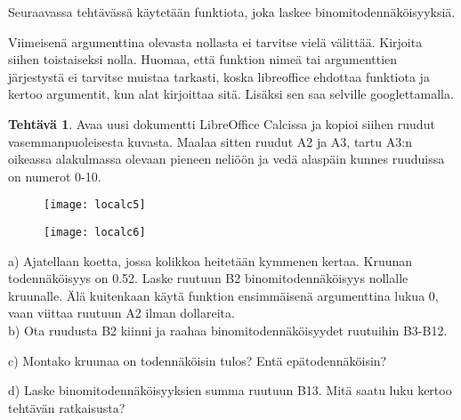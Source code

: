 \documentclass[12pt,leqno,a4paper,oneside]{amsart}
\theoremstyle{definition}
\newtheorem{exercise}{Tehtävä}
\theoremstyle{remark}
\numberwithin{equation}{section}
\begin{document}
Seuraavassa tehtävässä käytetään funktiota, joka laskee binomi\-toden\-näköisyyksiä.


Viimeisenä argumenttina olevasta nollasta ei tarvitse vielä välittää. Kirjoita siihen toistaiseksi nolla. Huomaa, että funktion nimeä
tai argumenttien järjestystä ei tarvitse muistaa tarkasti, koska libreoffice ehdottaa funktiota ja kertoo argumentit, kun alat kirjoittaa sitä.
Lisäksi sen saa selville googlettamalla.

\begin{exercise}
\label{lolaatikko}
 Avaa uusi dokumentti LibreOffice Calcissa ja kopioi sii\-hen ruudut vasemmanpuoleisesta kuvasta. Maalaa sitten ruudut A2 ja A3, tartu A3:n oikeassa alakulmassa
 olevaan pieneen neliöön ja vedä alaspäin kunnes ruuduissa on numerot 0-10.
 \begin{figure}[H]
 \begin{center} 
 \begin{minipage}{.45\textwidth}
 \texttt{[image: localc5]}
 \end{minipage}
 \begin{minipage}{.45\textwidth}
 \texttt{[image: localc6]}
 \end{minipage}
 \end{center}
 \end{figure}
 
 a) Ajatellaan koetta, jossa kolikkoa heitetään kymmenen kertaa. Kruunan todennäköisyys on 0.52. Laske ruutuun B2 binomitodennäköisyys nollalle
    kruunalle. Älä kuitenkaan käytä funktion ensimmäisenä argumenttina lukua 0, vaan viittaa ruutuun A2 ilman dollareita.\\
    
 b) Ota ruudusta B2 kiinni ja raahaa binomitodennäköisyydet ruutuihin B3-B12.
 
 c) Montako kruunaa on todennäköisin tulos? Entä epätodennäköisin?
 
 d) Laske binomitodennäköisyyksien summa ruutuun B13. Mitä saatu luku kertoo tehtävän ratkaisusta?
\end{exercise}
\end{document}
